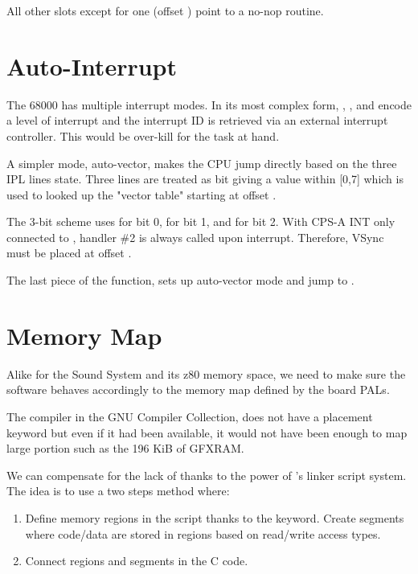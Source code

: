 

All other slots except for one (offset ) point to a no-nop routine.




\section{Auto-Interrupt}
The 68000 has multiple interrupt modes. In its most complex form, , , and  encode a level of interrupt and the interrupt ID is retrieved via an external interrupt controller. This would be over-kill for the task at hand.

A simpler mode, auto-vector, makes the CPU jump directly based on the three IPL lines state. Three lines are treated as bit giving a value within [0,7] which is used to looked up the "vector table" starting at offset .

The 3-bit scheme uses  for bit 0,  for bit 1, and  for bit 2. With CPS-A INT only connected to , handler \#2 is always called upon interrupt. Therefore, VSync must be placed at offset .



The last piece of the  function, sets up auto-vector mode and jump to .








\section{Memory Map}
Alike for the Sound System and its z80 memory space, we need to make sure the software behaves accordingly to the memory map defined by the board PALs.

The compiler in the GNU Compiler Collection,  does not have a placement keyword  but even if it had been available, it would not have been enough to map large portion such as the 196 KiB of GFXRAM.

We can compensate for the lack of  thanks to the power of 's linker script system. The idea is to use a two steps method where:
\begin{enumerate}
\item Define memory regions in the script thanks to the  keyword. Create segments where code/data are stored in regions based on read/write access types.
\item Connect regions and segments in the C code.
\end{enumerate}


